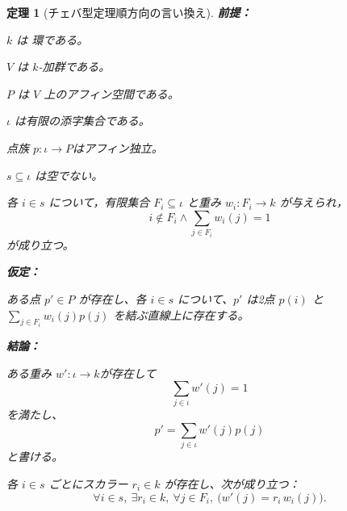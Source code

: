 \documentclass[a4paper,12pt]{bxjsbook}
\theoremstyle{theorem}
\newtheorem{theorem}{定理}[chapter]
\begin{document}
    \begin{theorem}[チェバ型定理順方向の言い換え]
        \noindent\textbf{前提：}\par
        \begin{theoremenumerate}[label=(P\arabic*), leftmargin=4em, topsep=2pt, partopsep=0pt, itemsep=0pt, parsep=0pt]
            \item $k$ は 環である。
            \item $V$ は $k$-加群である。
            \item $P$ は $V$ 上のアフィン空間である。
            \item $\iota$ は有限の添字集合である。
            \item 点族 $p : \iota \to P$はアフィン独立。
            \item $s \subseteq \iota$ は空でない。
            \item 各 $i\in s$ について，有限集合 $F_i\subseteq \iota$ と重み $w_i:F_i\to k$ が与えられ，
            \[
            i\notin F_i \land \sum_{j\in F_i} w_i(j)=1
            \]
            が成り立つ。
        \end{theoremenumerate}
        \noindent\textbf{仮定：}\par
        \begin{theoremenumerate}[label=(A\arabic*), leftmargin=4em, topsep=2pt, partopsep=0pt, itemsep=0pt, parsep=0pt]
            \item ある点 $p'\in P$ が存在し、各 $i \in s$ について、$p'$ は2点 $p(i)$ と $\sum_{j \in F_i} w_i(j)p(j)$ を結ぶ直線上に存在する。
        \end{theoremenumerate}

        \noindent\textbf{結論：}\par
        \begin{theoremenumerate}[label=(C\arabic*), leftmargin=4em, topsep=2pt, partopsep=0pt, itemsep=0pt, parsep=0pt]
            \item ある重み $w' : \iota \to k$が存在して
            \[
            \sum_{j \in \iota} w'(j) = 1
            \]
            を満たし、
            \[
            p' = \sum_{j \in \iota} w'(j)p(j)
            \]
            と書ける。
            \item 各 $i \in s$ ごとにスカラー $r_i \in k$ が存在し、次が成り立つ： 
            \[
            \forall i \in s,\ \exists r_i \in k,\ \forall j \in F_i,\ \bigl(w'(j) = r_i\, w_i(j)\bigr).
            \]
        \end{theoremenumerate}
    \end{theorem}
\end{document}
